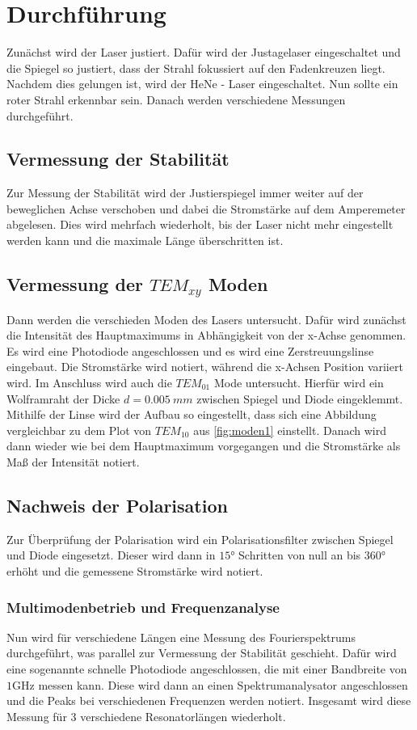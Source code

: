 \section{Durchführung}
\label{sec:Durchführung}

Zunächst wird der Laser justiert.
Dafür wird der Justagelaser eingeschaltet und die Spiegel so justiert, dass der Strahl fokussiert auf den Fadenkreuzen liegt.
Nachdem dies gelungen ist, wird der HeNe - Laser eingeschaltet.
Nun sollte ein roter Strahl erkennbar sein.
Danach werden verschiedene Messungen durchgeführt.

\subsection*{Vermessung der Stabilität}
Zur Messung der Stabilität wird der Justierspiegel immer weiter auf der beweglichen Achse verschoben und dabei die Stromstärke auf dem Amperemeter abgelesen.
Dies wird mehrfach wiederholt, bis der Laser nicht mehr eingestellt werden kann und die maximale Länge überschritten ist.

\subsection*{Vermessung der $TEM_{xy}$ Moden}
Dann werden die verschieden Moden des Lasers untersucht.
Dafür wird zunächst die Intensität des Hauptmaximums in Abhängigkeit von der x-Achse genommen.
Es wird eine Photodiode angeschlossen und es wird eine Zerstreuungslinse eingebaut.
Die Stromstärke wird notiert, während die x-Achsen Position variiert wird.
Im Anschluss wird auch die $TEM_{01}$ Mode untersucht.
Hierfür wird ein Wolframraht der Dicke $d = \qty{0.005}{mm}$ zwischen Spiegel und Diode eingeklemmt.
Mithilfe der Linse wird der Aufbau so eingestellt, dass sich eine Abbildung vergleichbar zu dem Plot von $TEM_{10}$ aus \autoref{fig:moden1} einstellt.
Danach wird dann wieder wie bei dem Hauptmaximum vorgegangen und die Stromstärke als Maß der Intensität notiert.

\subsection*{Nachweis der Polarisation}
Zur Überprüfung der Polarisation wird ein Polarisationsfilter zwischen Spiegel und Diode eingesetzt.
Dieser wird dann in $15°$ Schritten von null an bis $360°$ erhöht und die gemessene Stromstärke wird notiert.

\subsubsection*{Multimodenbetrieb und Frequenzanalyse}
Nun wird für verschiedene Längen eine Messung des Fourierspektrums durchgeführt,
was parallel zur Vermessung der Stabilität geschieht.
Dafür wird eine sogenannte schnelle Photodiode angeschlossen, die mit einer Bandbreite von $1 \unit{\giga\hertz}$ messen kann.
Diese wird dann an einen Spektrumanalysator angeschlossen und die Peaks bei verschiedenen Frequenzen werden notiert.
Insgesamt wird diese Messung für 3 verschiedene Resonatorlängen wiederholt.

